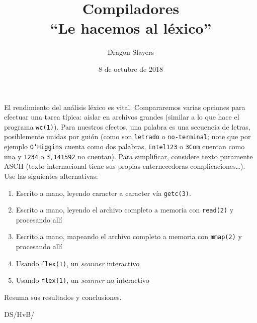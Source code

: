 \documentclass[english, spanish, fleqn]{article}
\title{Compiladores \\
       ``Le hacemos al léxico''}
\author{Dragon Slayers}
\date{8 de octubre de 2018}
\begin{document}
\maketitle
\thispagestyle{empty}

  El rendimiento del análisis léxico es vital.
  Compararemos varias opciones para efectuar una tarea típica:
  aislar  en archivos grandes
  (similar a lo que hace el programa \texttt{wc(1)}).
  Para nuestros efectos,
  una palabra es una secuencia de letras, posiblemente unidas por guión
  (como son \texttt{letrado} o \texttt{no-terminal};
   note que por ejemplo \texttt{O'Higgins} cuenta como dos palabras,
   \texttt{Entel123} o \texttt{3Com} cuentan como una
   y \texttt{1234} o \texttt{3,141592} no cuentan).
  Para simplificar,
  considere texto puramente ASCII
  (texto internacional
   tiene sus propias enternecedoras complicaciones\ldots).
  Use las siguientes alternativas:
  \begin{enumerate}
  \item %
    Escrito a mano,
    leyendo caracter a caracter vía \texttt{getc(3)}.
  \item %
    Escrito a mano,
    leyendo el archivo completo a memoria con \texttt{read(2)}
    y procesando allí
  \item %
    Escrito a mano,
    mapeando el archivo completo a memoria con \texttt{mmap(2)}
    y procesando allí
  \item %
    Usando \texttt{flex(1)},
    un \emph{\foreignlanguage{english}{scanner}} interactivo
  \item %
    Usando \texttt{flex(1)},
    un \emph{\foreignlanguage{english}{scanner}} no interactivo
  \end{enumerate}
  Resuma sus resultados y conclusiones.


  \vfill\hfill DS/HvB/\LaTeXe
\end{document}
